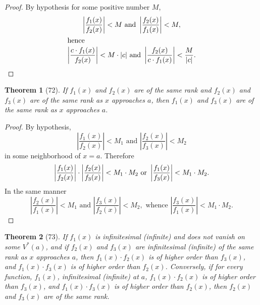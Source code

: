 \documentclass[a4paper,12pt]{book}[2004/02/16]
\providecommand{\hypertarget}[2]{#2}
\theoremstyle{ilemma}
\theoremstyle{itheorem}
\newtheorem{theorem}{Theorem}
\theoremstyle{iother}
\theoremstyle{icorollary}
\theoremstyle{numcorollary}
\theoremstyle{idefinition}
\begin{document}
\begin{proof}
By hypothesis for some positive number $M$,
\begin{gather*}
  \left|\frac{f_1(x)}{f_2(x)} \right|< M \text{ and }
  \left|\frac{f_2(x)}{f_1(x)} \right|< M,\\
\intertext{hence}
  \left|\frac{c \cdot f_1(x)}{f_2(x)} \right|< M \cdot|c| \text{ and }
  \left|\frac{f_2(x)}{c \cdot f_1(x)} \right|< \frac{M}{|c|}.\qedhere
\end{gather*}
\end{proof}

\begin{theorem}[72]\hypertarget{thm72}{}
If $f_1(x)$ and $f_2(x)$ are of the same rank and $f_2(x)$ and
$f_3(x)$ are of the same rank as $x$ approaches $a$, then $f_1(x)$ and
$f_3(x)$ are of the same rank as $x$ approaches $a$.
\end{theorem}

\begin{proof}
By hypothesis,
\[
  \left|\frac{f_1(x)}{f_2(x)} \right|< M_1 \text{ and }
  \left|\frac{f_2(x)}{f_3(x)} \right|< M_2
\]
in some neighborhood of $x=a$. Therefore
\[
  \left|\frac{f_1(x)}{f_2(x)} \right|\cdot
  \left|\frac{f_2(x)}{f_3(x)} \right|< M_1 \cdot M_2 \text{ or }
  \left|\frac{f_1(x)}{f_3(x)} \right|< M_1 \cdot M_2.\qedhere
\]
In the same manner
\[
  \left|\frac{f_2(x)}{f_1(x)} \right|< M_1 \text{ and }
  \left|\frac{f_3(x)}{f_2(x)} \right|< M_2, \text{ whence }
  \left|\frac{f_3(x)}{f_1(x)} \right|< M_1 \cdot M_2.
\]
\end{proof}
\begin{theorem}[73]\hypertarget{thm73}{}
If $f_1(x)$ is infinitesimal (infinite) and does not vanish on some
$V^*(a)$, and if $f_2(x)$ and $f_3(x)$ are infinitesimal (infinite) of
the same rank as $x$ approaches $a$, then $f_1(x) \cdot f_2(x)$ is of
higher order than $f_3(x)$, and $f_1(x) \cdot f_3(x)$ is of higher
order than $f_2(x)$. Conversely, if for every function, $f_1(x)$,
infinitesimal (infinite) at $a$, $f_1(x) \cdot f_2(x)$ is of higher
order than $f_3(x)$, and $f_1(x) \cdot f_3(x)$ is of higher order than
$f_2(x)$, then $f_2(x)$ and $f_3(x)$ are of the same rank.
\end{theorem}
\end{document}

